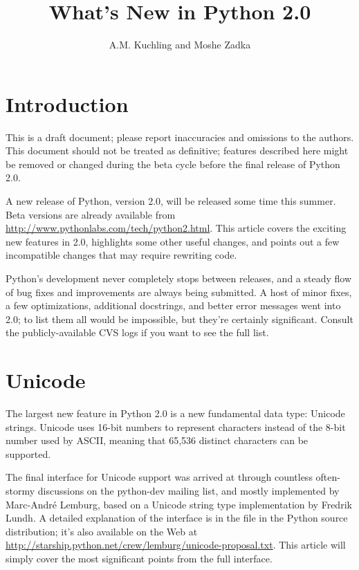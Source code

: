 \documentclass{howto}
\title{What's New in Python 2.0}
\author{A.M. Kuchling and Moshe Zadka}
\begin{document}
\maketitle\tableofcontents

\section{Introduction}

{\large This is a draft document; please report inaccuracies and
omissions to the authors.  This document should not be treated as
definitive; features described here might be removed or changed during
the beta cycle before the final release of Python 2.0. 
}

A new release of Python, version 2.0, will be released some time this
summer.  Beta versions are already available from
\url{http://www.pythonlabs.com/tech/python2.html}.  This article
covers the exciting new features in 2.0, highlights some other useful
changes, and points out a few incompatible changes that may require
rewriting code.

Python's development never completely stops between releases, and a
steady flow of bug fixes and improvements are always being submitted.
A host of minor fixes, a few optimizations, additional docstrings, and
better error messages went into 2.0; to list them all would be
impossible, but they're certainly significant.  Consult the
publicly-available CVS logs if you want to see the full list.

\section{Unicode}

The largest new feature in Python 2.0 is a new fundamental data type:
Unicode strings.  Unicode uses 16-bit numbers to represent characters
instead of the 8-bit number used by ASCII, meaning that 65,536
distinct characters can be supported.

The final interface for Unicode support was arrived at through
countless often-stormy discussions on the python-dev mailing list, and
mostly implemented by Marc-Andr\'e Lemburg, based on a Unicode string
type implementation by Fredrik Lundh.  A detailed explanation of the
interface is in the file  in the Python source
distribution; it's also available on the Web at
\url{http://starship.python.net/crew/lemburg/unicode-proposal.txt}.
This article will simply cover the most significant points from the
full interface.
\end{document}

